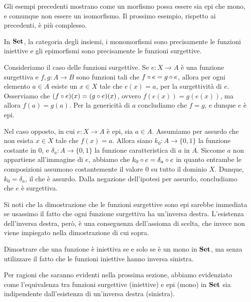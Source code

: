 Gli esempi precedenti mostrano come
un morfismo possa essere sia epi che mono, e comunque non essere un isomorfismo.
Il prossimo esempio, rispetto ai precedenti, è più complesso.

\begin{example}
	In \(\mathbf{Set}\), la categoria degli insiemi, i monomorfismi sono precisamente le funzioni iniettive
	e gli epimorfismi sono precisamente le funzioni surgettive.

	Consideriamo il caso delle funzioni surgettive.
	Se \(e \colon X \to A\) è una funzione surgettiva e \(f, g \colon A \to B\) sono funzioni tali che \(f \circ e = g \circ e\),
	allora per ogni elemento \(a \in A\) esiste un \(x \in X\) tale che \(e(x) = a\), per la surgettività di \(e\).
	Osserviamo che \((f \circ e)(x) = (g \circ e)(x)\), ovvero \(f(e(x)) = g(e(x))\),
	ma allora \(f(a) = g(a)\).
	Per la genericità di \(a\) concludiamo che \(f = g\), e dunque \(e\) è epi.

	Nel caso opposto, in cui \(e \colon X \to A\) è epi, sia \(a \in A\).
	Assumiamo per assurdo che non esista \(x \in X\) tale che \(f(x) = a\).
	Allora siano \(k_0 \colon A \to \{0, 1\}\) la funzione costante in \(0\),
	e \(\delta_a \colon A \to \{0, 1\}\) la funzione caratteristica di \(a\) in \(A\).
	Siccome \(a\) non appartiene all'immagine di \(e\), abbiamo che \(k_0 \circ e = \delta_a \circ e\)
	in quanto entrambe le composizioni assumono costantemente il valore \(0\) su tutto il dominio \(X\).
	Dunque, \(k_0 = \delta_a\), il che è assurdo.
	Dalla negazione dell'ipotesi per assurdo, concludiamo che \(e\) è surgettiva.
\end{example}

Si noti che la dimostrazione che le funzioni surgettive sono epi sarebbe immediata
se usassimo il fatto che ogni funzione surgettiva ha un'inversa destra.
L'esistenza dell'inversa destra, però, è una conseguenza dell'assioma di scelta,
che invece non viene impiegato nella dimostrazione di cui sopra.

\begin{exercise}
	Dimostrare che una funzione è iniettiva se e solo se è un mono in \(\mathbf{Set}\),
	ma senza utilizzare il fatto che le funzioni iniettive hanno inversa sinistra.
\end{exercise}

Per ragioni che saranno evidenti nella prossima sezione,
abbiamo evidenziato come l'equivalenza tra funzioni surgettive (iniettive)
e epi (mono) in \(\mathbf{Set}\) sia indipendente dall'esistenza di un'inversa destra (sinistra).

